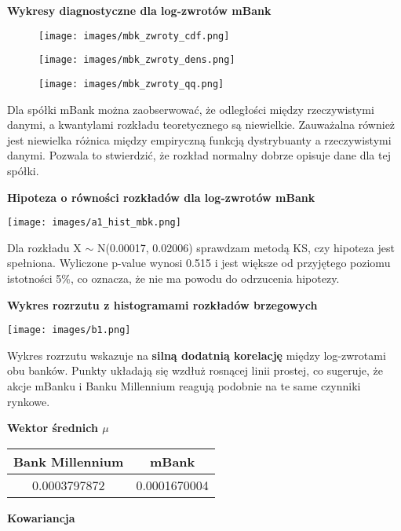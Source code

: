 \documentclass[12pt]{article}
\begin{document}
{\bf \large Wykresy diagnostyczne dla log-zwrotów mBank}

\begin{figure}[ht]
  \begin{minipage}[b]{0.48\textwidth}
    \centering
    \texttt{[image: images/mbk\_zwroty\_cdf.png]}
  \end{minipage}
  \hfill
  \begin{minipage}[b]{0.48\textwidth}
    \centering
    \texttt{[image: images/mbk\_zwroty\_dens.png]}
  \end{minipage}

  \vspace{0.5 cm}

  \begin{minipage}[t]{\textwidth}
    \centering
    \texttt{[image: images/mbk\_zwroty\_qq.png]}
  \end{minipage}
\end{figure}

Dla spółki mBank można zaobserwować, że odległości między rzeczywistymi danymi, a kwantylami rozkładu teoretycznego są niewielkie. Zauważalna również jest niewielka różnica między empiryczną funkcją dystrybuanty a rzeczywistymi danymi. Pozwala to stwierdzić, że rozkład normalny dobrze opisuje dane dla tej spółki.
\clearpage

{\bf \large Hipoteza o równości rozkładów dla log-zwrotów mBank}

\texttt{[image: images/a1\_hist\_mbk.png]}

Dla rozkładu X \(\sim \) N(0.00017, 0.02006) sprawdzam metodą KS, czy hipoteza jest spełniona. 
Wyliczone p-value wynosi 0.515 i jest większe od przyjętego poziomu istotności 5\%, co oznacza, że nie ma powodu do odrzucenia hipotezy.
\clearpage

{\bf \large Wykres rozrzutu z histogramami rozkładów brzegowych}
    \vspace{0.5 cm}
     \begin{center}
     \texttt{[image: images/b1.png]}
\end{center}
Wykres rozrzutu wskazuje na \textbf{silną dodatnią korelację} między log-zwrotami obu banków. Punkty układają się wzdłuż rosnącej linii prostej, co sugeruje, że akcje mBanku i Banku Millennium reagują podobnie na te same czynniki rynkowe.
\vspace{1.5 cm}

{\bf \large Wektor średnich $\mu$} 
    \vspace{0.5 cm}
\begin{center}
\begin{tabular}{||c c||} 
 \hline
Bank Millennium & mBank  \\  
 \hline\hline
0.0003797872 & 0.0001670004 \\
 \hline
 \end{tabular}
\end{center}
{\bf \large Kowariancja} 
    
\end{document}
